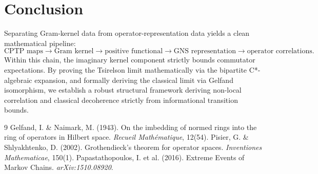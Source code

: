 \documentclass[11pt, a4paper]{article}
\begin{document}
\section{Conclusion}

Separating Gram-kernel data from operator-representation data yields a clean mathematical pipeline:
\[
\text{CPTP maps}\to \text{Gram kernel}\to \text{positive functional}\to \text{GNS representation}\to \text{operator correlations}.
\]
Within this chain, the imaginary kernel component strictly bounds commutator expectations. By proving the Tsirelson limit mathematically via the bipartite C*-algebraic expansion, and formally deriving the classical limit via Gelfand isomorphism, we establish a robust structural framework deriving non-local correlation and classical decoherence strictly from informational transition bounds.

\begin{thebibliography}{9}
 Gelfand, I. \& Naimark, M. (1943). On the imbedding of normed rings into the ring of operators in Hilbert space. \textit{Recueil Math\'ematique}, 12(54).
 Pisier, G. \& Shlyakhtenko, D. (2002). Grothendieck's theorem for operator spaces. \textit{Inventiones Mathematicae}, 150(1).
 Papastathopoulos, I. et al. (2016). Extreme Events of Markov Chains. \textit{arXiv:1510.08920}.
\end{thebibliography}
\end{document}
